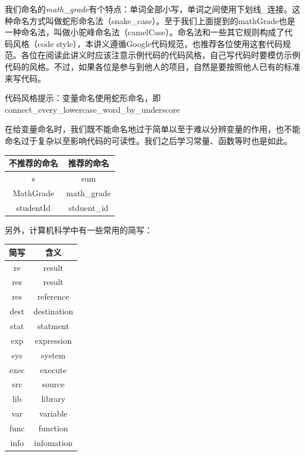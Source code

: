 我们命名的\textit{math\_grade}有个特点：单词全部小写，单词之间使用下划线\_连接。这种命名方式叫做蛇形命名法（snake\_case）。至于我们上面提到的mathGrade也是一种命名法，叫做小驼峰命名法（camelCase）。命名法和一些其它规则构成了代码风格（code style），本讲义遵循Google代码规范，也推荐各位使用这套代码规范。各位在阅读此讲义时应该注意示例代码的代码风格，自己写代码时要模仿示例代码的风格。不过，如果各位是参与到他人的项目，自然是要按照他人已有的标准来写代码。

\begin{framed}
    代码风格提示：变量命名使用蛇形命名，即connect\_every\_lowercase\_word\_by\_underscore
\end{framed}


在给变量命名时，我们既不能命名地过于简单以至于难以分辨变量的作用，也不能命名过于复杂以至影响代码的可读性。我们之后学习常量、函数等时也是如此。

\begin{longtable}{c|c}
    不推荐的命名 & 推荐的命名\\
    \hline
    s & sum\\
    \hline
    MathGrade & math\_grade\\
    \hline
    studentId & stduent\_id\\ 
\end{longtable}

另外，计算机科学中有一些常用的简写：

\begin{longtable}{c|c}
    简写 & 含义\\
    \hline
    re & result\\
    \hline
    res & result\\
    \hline
    res & reference\\
    \hline
    dest & destination\\
    \hline
    stat & statment\\
    \hline
    exp & expression\\
    \hline
    sys & system\\
    \hline
    exec & execute\\
    \hline
    src & source\\
    \hline
    lib & library\\
    \hline
    var & variable\\
    \hline
    func & function\\
    \hline
    info & infomation\\
\end{longtable}

